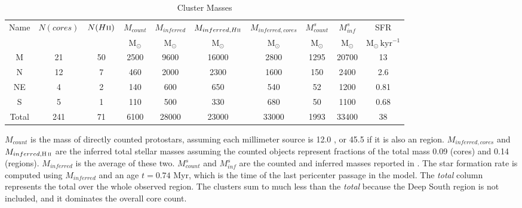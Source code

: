\begin{table*}[htp]
\centering
\caption{Cluster Masses}
\begin{tabular}{cccccccccc}
\label{tab:clustermassestimates}
Name & $N(cores)$ & $N(H\textsc{ii})$ & $M_{count}$ & $M_{inferred}$ & $M_{inferred, H\textsc{ii}}$ & $M_{inferred, cores}$ & $M_{count}^s$ & $M_{inf}^s$ & SFR \\
 &  &  & $\mathrm{M_{\odot}}$ & $\mathrm{M_{\odot}}$ & $\mathrm{M_{\odot}}$ & $\mathrm{M_{\odot}}$ & $\mathrm{M_{\odot}}$ & $\mathrm{M_{\odot}}$ & $\mathrm{M_{\odot}\,kyr^{-1}}$ \\
\hline
M & 21 & 50 & 2500 & 9600 & 16000 & 2800 & 1295 & 20700 & 13 \\
N & 12 & 7 & 460 & 2000 & 2300 & 1600 & 150 & 2400 & 2.6 \\
NE & 4 & 2 & 140 & 600 & 650 & 540 & 52 & 1200 & 0.81 \\
S & 5 & 1 & 110 & 500 & 330 & 680 & 50 & 1100 & 0.68 \\
Total & 241 & 71 & 6100 & 28000 & 23000 & 33000 & 1993 & 33400 & 38 \\
\hline
\end{tabular}
\par
$M_{count}$ is the mass of directly counted protostars, assuming each millimeter source is 12.0 \msun, or 45.5 \msun if it is also an \hii region.  $M_{inferred,cores}$ and $M_{inferred,\hii}$ are the inferred total stellar masses assuming the counted objects represent fractions of the total mass 0.09 (cores) and 0.14 (\hii regions).  $M_{inferred}$ is the average of these two.  $M_{count}^s$ and $M_{inf}^s$ are the counted and inferred masses reported in \citet{Schmiedeke2016a}.  The star formation rate is computed using $M_{inferred}$ and an age $t=0.74$ Myr, which is the time of the last pericenter passage in the \citet{Kruijssen2015a} model.  The \emph{total} column represents the total over the whole observed region.    The clusters sum to much less than the \emph{total} because the Deep South region is not included, and it dominates the overall core count.
\end{table*}

